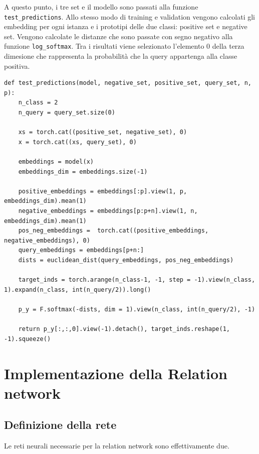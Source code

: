 \documentclass[12pt,a4paper,titlepage]{article}
\begin{document}
A questo punto, i tre set e il modello sono passati alla funzione \texttt{test\_predictions}.
Allo stesso modo di training e validation vengono calcolati gli embedding per ogni istanza e i prototipi delle due classi: positive set e negative set.
Vengono calcolate le distanze che sono passate con segno negativo alla funzione \texttt{log\_softmax}. Tra i risultati viene selezionato l'elemento 0 della terza dimesione che rappresenta la probabilità che la query appartenga alla classe positiva.

\begin{lstlisting}[language=iPython,firstnumber=11, caption=Funzione \texttt{test\_prediction}, label=test_predictions,captionpos=b]
def test_predictions(model, negative_set, positive_set, query_set, n, p):
    n_class = 2
    n_query = query_set.size(0)
    
    xs = torch.cat((positive_set, negative_set), 0)   
    x = torch.cat((xs, query_set), 0)
    
    embeddings = model(x)
    embeddings_dim = embeddings.size(-1)
    
    positive_embeddings = embeddings[:p].view(1, p, embeddings_dim).mean(1)    
    negative_embeddings = embeddings[p:p+n].view(1, n, embeddings_dim).mean(1)     
    pos_neg_embeddings =  torch.cat((positive_embeddings, negative_embeddings), 0)
    query_embeddings = embeddings[p+n:]
    dists = euclidean_dist(query_embeddings, pos_neg_embeddings)

    target_inds = torch.arange(n_class-1, -1, step = -1).view(n_class, 1).expand(n_class, int(n_query/2)).long()

    p_y = F.softmax(-dists, dim = 1).view(n_class, int(n_query/2), -1)

    return p_y[:,:,0].view(-1).detach(), target_inds.reshape(1, -1).squeeze()
\end{lstlisting}
\clearpage


\section{Implementazione della Relation network}
\subsection{Definizione della rete}
Le reti neurali necessarie per la relation network sono effettivamente due.
\end{document}
